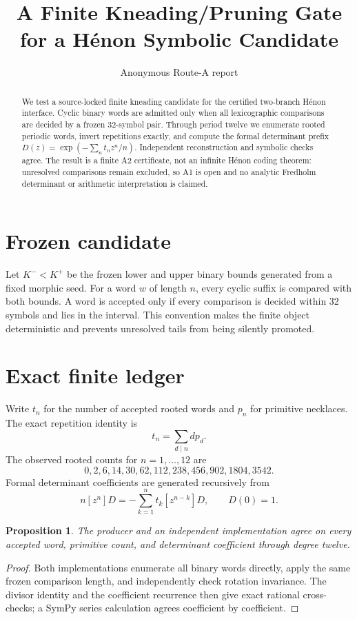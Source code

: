 \documentclass[10pt]{article}
\title{A Finite Kneading/Pruning Gate for a H\'enon Symbolic Candidate}
\author{Anonymous Route-A report}
\date{}
\newtheorem{proposition}{Proposition}
\begin{document}
\maketitle
\begin{abstract}
We test a source-locked finite kneading candidate for the certified
two-branch H\'enon interface.  Cyclic binary words are admitted only when all
lexicographic comparisons are decided by a frozen 32-symbol pair.  Through
period twelve we enumerate rooted periodic words, invert repetitions exactly,
and compute the formal determinant prefix
$D(z)=\exp(-\sum_n t_nz^n/n)$.  Independent reconstruction and symbolic
checks agree.  The result is a finite A2 certificate, not an infinite H\'enon
coding theorem: unresolved comparisons remain excluded, so A1 is open and no
analytic Fredholm determinant or arithmetic interpretation is claimed.
\end{abstract}

\section{Frozen candidate}
Let $K^-<K^+$ be the frozen lower and upper binary bounds generated from a
fixed morphic seed.  For a word $w$ of length $n$, every cyclic suffix is
compared with both bounds.  A word is accepted only if every comparison is
decided within 32 symbols and lies in the interval.  This convention makes
the finite object deterministic and prevents unresolved tails from being
silently promoted.

\section{Exact finite ledger}
Write $t_n$ for the number of accepted rooted words and $p_n$ for primitive
necklaces.  The exact repetition identity is
\[
t_n=\sum_{d\mid n}d p_d.
\]
The observed rooted counts for $n=1,\ldots,12$ are
\[
0,2,6,14,30,62,112,238,456,902,1804,3542.
\]
Formal determinant coefficients are generated recursively from
\[
n[z^n]D=-\sum_{k=1}^n t_k[z^{n-k}]D,
\qquad D(0)=1.
\]

\begin{proposition}
The producer and an independent implementation agree on every accepted word,
primitive count, and determinant coefficient through degree twelve.
\end{proposition}
\begin{proof}
Both implementations enumerate all binary words directly, apply the same
frozen comparison length, and independently check rotation invariance.  The
divisor identity and the coefficient recurrence then give exact rational
cross-checks; a SymPy series calculation agrees coefficient by coefficient.
\end{proof}
\end{document}
